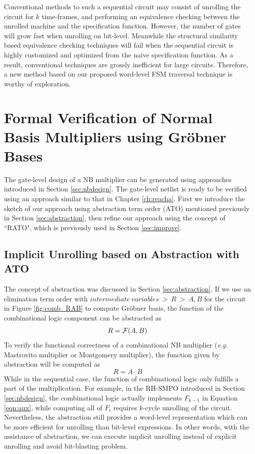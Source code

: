 Conventional methods to such a sequential circuit may consist of unrolling the circuit for 
$k$ time-frames, and performing an equivalence checking between the unrolled machine and
the specification function. However, the number of gates will grow fast when unrolling
on bit-level. Meanwhile the structural similarity based equivalence checking techniques 
will fail when the sequential circuit is highly customized and optimized from the naive specification 
function. As a result, conventional techniques are grossly inefficient for large circuits.
Therefore, a new method based on our proposed word-level FSM traversal technique is worthy of exploration.

\section{Formal Verification of Normal Basis Multipliers using Gr\"obner Bases}
The gate-level design of a NB multiplier can be generated using approaches introduced in 
Section \ref{sec:nbdesign}. The gate-level netlist is ready to be verified using 
an approach similar to that in Chapter \ref{ch:reacha}. 
First we introduce the sketch of our approach using abstraction term order (ATO)
mentioned previously in Section \ref{sec:abstraction}, then refine our approach using 
the concept of ``RATO", which is previously used in Section \ref{sec:improve}.
\subsection{Implicit Unrolling based on Abstraction with ATO}
The concept of abstraction was discussed in Section \ref{sec:abstraction}. If we use an elimination term order with
$intermediate~variables~>~R~>~A,B$ for the circuit in Figure \ref{fig:comb_RAB} to compute Gr\"obner basis, 
the function of the combinational logic component can be abstracted as 
$$R = {\mathcal{F}}(A,B)$$
To verify the functional correctness of a combinational NB multiplier ({\it e.g.} Mastrovito multiplier
or Montgomery multiplier), the function given by abstraction will be computed as
$$R=A\cdot B$$
While in the sequential case, the function of combinational logic only fulfills a part of the multiplication.
For example, in the RH-SMPO introduced in Section \ref{sec:nbdesign}, 
the combinational logic actually implements  $F_{k-1}$ in Equation \ref{eqn:aux},
while computing all of $F_i$ requires $k$-cycle unrolling of the circuit.
Nevertheless, the abstraction still provides a word-level 
representation which can be more efficient for unrolling than bit-level expressions.
In other words, with the assistance of abstraction, we can execute implicit unrolling instead of 
explicit unrolling and avoid bit-blasting problem.


